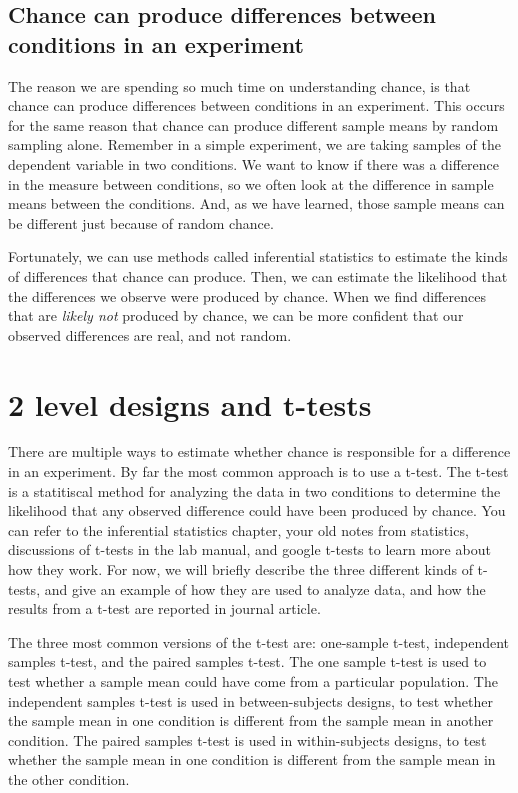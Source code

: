 \subsection{Chance can produce differences between conditions in an
experiment}\label{chance-can-produce-differences-between-conditions-in-an-experiment}

The reason we are spending so much time on understanding chance, is that
chance can produce differences between conditions in an experiment. This
occurs for the same reason that chance can produce different sample
means by random sampling alone. Remember in a simple experiment, we are
taking samples of the dependent variable in two conditions. We want to
know if there was a difference in the measure between conditions, so we
often look at the difference in sample means between the conditions.
And, as we have learned, those sample means can be different just
because of random chance.

Fortunately, we can use methods called inferential statistics to
estimate the kinds of differences that chance can produce. Then, we can
estimate the likelihood that the differences we observe were produced by
chance. When we find differences that are \emph{likely not} produced by
chance, we can be more confident that our observed differences are real,
and not random.

\section{2 level designs and t-tests}\label{level-designs-and-t-tests}

There are multiple ways to estimate whether chance is responsible for a
difference in an experiment. By far the most common approach is to use a
t-test. The t-test is a statitiscal method for analyzing the data in two
conditions to determine the likelihood that any observed difference
could have been produced by chance. You can refer to the inferential
statistics chapter, your old notes from statistics, discussions of
t-tests in the lab manual, and google t-tests to learn more about how
they work. For now, we will briefly describe the three different kinds
of t-tests, and give an example of how they are used to analyze data,
and how the results from a t-test are reported in journal article.

The three most common versions of the t-test are: one-sample t-test,
independent samples t-test, and the paired samples t-test. The one
sample t-test is used to test whether a sample mean could have come from
a particular population. The independent samples t-test is used in
between-subjects designs, to test whether the sample mean in one
condition is different from the sample mean in another condition. The
paired samples t-test is used in within-subjects designs, to test
whether the sample mean in one condition is different from the sample
mean in the other condition.

